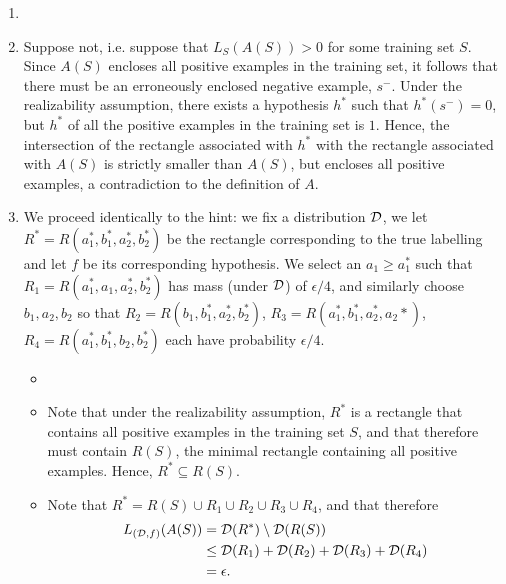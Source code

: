 \begin{ex}
  \begin{enumerate}
    \item[]
    \item Suppose not, i.e. suppose that $L_S(A(S))>0$ for some training set
          $S$. Since $A(S)$ encloses
          all positive examples in the training set, it follows that there must
          be an erroneously enclosed negative example, $s^-$. Under the
          realizability assumption, there exists a hypothesis $h^*$ such that
          $h^*(s^-)=0$, but $h^*$ of all the positive examples in the training
          set is $1$. Hence, the intersection of the rectangle associated
          with $h^*$ with the rectangle associated with $A(S)$ is strictly
          smaller than $A(S)$, but encloses all positive examples, a
          contradiction to the definition of $A$.
    \item We proceed identically to the hint: we fix a distribution $\mathcal{D}$, we let
          $R^*=R(a_1^*, b_1^*, a_2^*, b_2^*)$ be the rectangle corresponding to the
          true labelling and let $f$ be its corresponding hypothesis. We select an
          $a_1\geq a_1^*$ such that $R_1=R(a_1^*, a_1, a_2^*, b_2^*)$ has mass
          (under $\mathcal{D}$) of $\epsilon/4$, and similarly choose $b_1, a_2, b_2$ so
          that
          $R_2=R(b_1, b_1^*, a_2^*, b_2^*)$,
          $R_3=R(a_1^*, b_1^*, a_2^*, a_2*)$,
          $R_4=R(a_1^*, b_1^*, b_2, b_2^*)$ each have probability $\epsilon/4$.
          \begin{itemize}
            \item []
            \item Note that under the realizability assumption,
                  $R^*$ is a rectangle that contains all positive
                  examples in the training set $S$, and that therefore must
                  contain $R(S)$, the minimal rectangle containing all positive
                  examples. Hence, $R^*\subseteq R(S)$.
            \item Note that $R^*=R(S)\cup R_1\cup R_2\cup R_3\cup R_4$, and that
                  therefore
                  \begin{align*}
                    L_{(\mathcal{D},f)}(A(S))
                     & =\mathcal{D}(R^*)\setminus \mathcal{D}(R(S))                 \\
                     & \leq \mathcal{D}(R_1) + \mathcal{D}(R_2) + \mathcal{D}(R_3) + \mathcal{D}(R_4) \\
                     & =\epsilon.
                  \end{align*}

\end{itemize}
\end{enumerate}
\end{ex}
